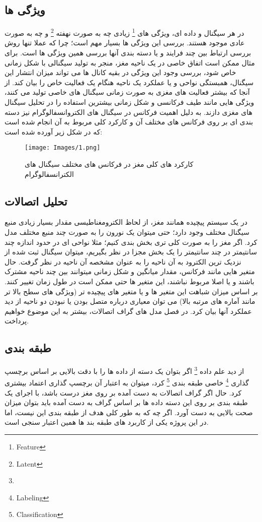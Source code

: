 \documentclass[11pt]{extarticle}
\begin{document}
\subsection{ویژگی ها}
در هر سیگنال و داده ای، ویژگی های
\footnote{Feature}
 زیادی چه به صورت نهفته 
\footnote{Latent}
و چه به صورت عادی موجود هستند. بررسی این ویژگی ها بسیار مهم است؛ چرا که عملا تنها روش بررسی ارتباط بین چند فرایند و یا دسته بندی آنها بررسی همین ویژگی ها است. برای مثال ممکن است اتفاق خاصی در یک ناحیه مغز، منجر به تولید سیگنالی با شکل زمانی خاص شود، بررسی وجود این ویژگی در بقیه کانال ها می تواند میزان انتشار این سیگنال، همبستگی نواحی و یا عملکرد یک ناحیه هنگام یک فعالیت خاص را بیان کند. از آنجا که بیشتر فعالیت های مغزی به صورت زمانی سیگنال های خاصی تولید می کنند، ویژگی هایی مانند طیف فرکانسی و شکل زمانی بیشترین استفاده را در تحلیل سیگنال های مغزی دازند. به دلیل اهمیت فرکانس در سیگنال های الکتروانسفالوگرام نیز دسته بندی ای بر روی فرکانس های مختلف آن و کارکرد کلی مربوط به آن انجام شده است که در شکل زیر آورده شده است:
\begin{figure}[h!]
	\centering
	\texttt{[image: Images/1.png]}
	\caption{کارکرد های کلی مغز در فرکانس های مختلف سیگنال های الکترانسفالوگرام}
	\label{fig:2}
\end{figure}

\subsection{تحلیل اتصالات}
در یک سیستم پیچیده همانند مغز، از لحاظ الکترومغناطیسی مقدار بسیار زیادی منبع سیگنال مختلف وجود دارد؛ حتی میتوان یک نورون را به صورت چند منبع مختلف مدل کرد. اگر مغز را به صورت کلی تری بخش بندی کنیم؛ مثلا نواحی ای در حدود اندازه چند سانتیمتر در چند سانتیمتر را یک بخش مجزا در نظر بگیریم، میتوان سیگنال ثبت شده از نزدیک ترین الکترود به آن ناحیه را به عنوان مشخصه آن ناحیه در نظر گرفت. حال متغیر هایی مانند فرکانس، مقدار میانگین و شکل زمانی میتوانند بین چند ناحیه مشترک باشند و یا اصلا مربوط نباشند، این متغیر ها حتی ممکن است در طول زمان تغییر کنند. بر اساس میزان شباهت این متغیر ها و یا متغیر های پیچیده تر (ویژگی های سطح بالا تر مانند آماره های مرتبه بالا) می توان معیاری درباره متصل بودن یا نبودن دو ناحیه از دید عملکرد آنها بیان کرد. در فصل مدل های گراف اتصالات، بیشتر به این موضوع خواهیم پرداخت.
\subsection{طبقه بندی}
از دید علم داده
\footnote{}
اگر بتوان یک دسته از داده ها را با دقت بالایی بر اساس برچسپ گذاری 
\footnote{Labeling}
خاصی طبقه بندی
\footnote{Classification}
 کرد، میتوان به اعتبار آن برچسپ گذاری اعتماد بیشتری کرد. حال اگر گراف اتصالات به دست آمده بر روی مغز درست باشد، با اجرای یک طبقه بندی بر روی این دسته داده ها بر اساس گراف به دست آمده باید بتوان میزان صحت بالایی به دست آورد. اگر چه که به طور کلی هدف از طبقه بندی این نیست، اما در این پروژه یکی از کاربرد های طبقه بند ها همین اعتبار سنجی است. 
\end{document}
